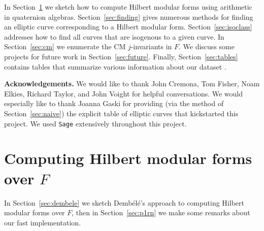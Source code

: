 \documentclass{amsart}
\newcommand{\dembele}{Demb\'el{\'e}\xspace}
\begin{document}
In Section~\ref{sec:hmf} we sketch how to compute Hilbert modular
forms using arithmetic in quaternion
algebras. Section~\ref{sec:finding} gives numerous methods for finding
an elliptic curve corresponding to a Hilbert modular form.
Section~\ref{sec:isoclass} addresses how to find all curves that are
isogenous to a given curve.  
In Section~\ref{sec:cm} we enumerate the CM $j$-invariants in $F$.
We discuss some projects for future work in
Section~\ref{sec:future}.  Finally, Section~\ref{sec:tables} contains
tables that summarize various information about our
dataset \cite{sqrt5data}.


{\bf Acknowledgements.} We would like to thank John Cremona, Tom
Fisher, Noam Elkies, Richard Taylor, and John Voight for helpful
conversations.  We would especially like to thank Joanna Gaski for
providing (via the method of Section~\ref{sec:naive}) the explicit
table of elliptic curves that kickstarted this project.
We used {\tt Sage} \cite{sage} extensively throughout this project.

\section{Computing Hilbert modular forms over $F$}\label{sec:hmf}

In Section~\ref{sec:dembele} we sketch \dembele's approach to computing Hilbert
modular forms over $F$, then in Section~\ref{sec:p1rn} we make
some remarks about our fast implementation. 
\end{document}
